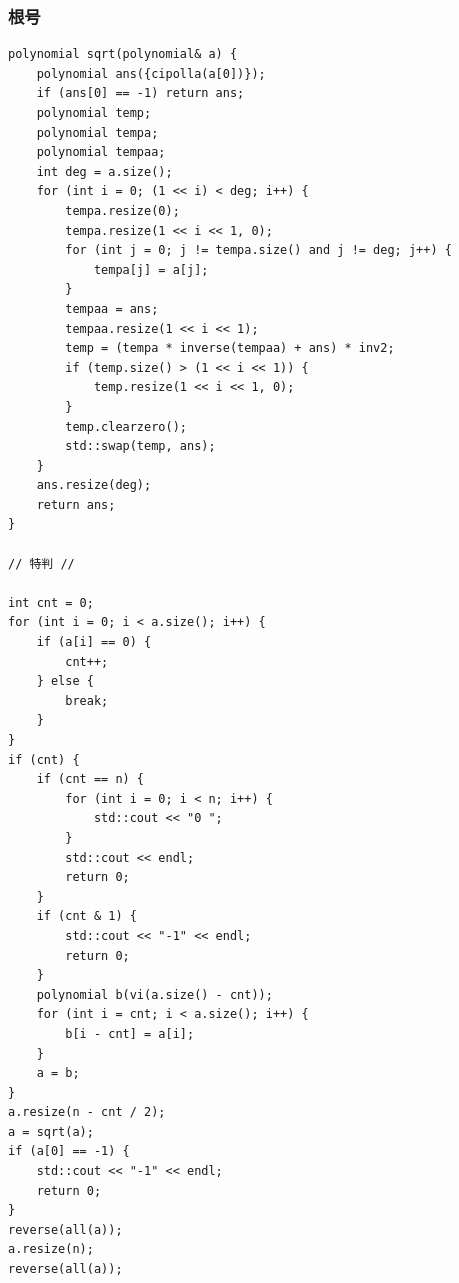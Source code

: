 \documentclass[UTF8, a4paper, titlepage, twoside]{ctexart}
\begin{document}
\subsubsection*{ 根号 }
\begin{lstlisting}[style=cpp]
polynomial sqrt(polynomial& a) {
    polynomial ans({cipolla(a[0])});
    if (ans[0] == -1) return ans;
    polynomial temp;
    polynomial tempa;
    polynomial tempaa;
    int deg = a.size();
    for (int i = 0; (1 << i) < deg; i++) {
        tempa.resize(0);
        tempa.resize(1 << i << 1, 0);
        for (int j = 0; j != tempa.size() and j != deg; j++) {
            tempa[j] = a[j];
        }
        tempaa = ans;
        tempaa.resize(1 << i << 1);
        temp = (tempa * inverse(tempaa) + ans) * inv2;
        if (temp.size() > (1 << i << 1)) {
            temp.resize(1 << i << 1, 0);
        }
        temp.clearzero();
        std::swap(temp, ans);
    }
    ans.resize(deg);
    return ans;
}

// 特判 //

int cnt = 0;
for (int i = 0; i < a.size(); i++) {
    if (a[i] == 0) {
        cnt++;
    } else {
        break;
    }
}
if (cnt) {
    if (cnt == n) {
        for (int i = 0; i < n; i++) {
            std::cout << "0 ";
        }
        std::cout << endl;
        return 0;
    }
    if (cnt & 1) {
        std::cout << "-1" << endl;
        return 0;
    }
    polynomial b(vi(a.size() - cnt));
    for (int i = cnt; i < a.size(); i++) {
        b[i - cnt] = a[i];
    }
    a = b;
}
a.resize(n - cnt / 2);
a = sqrt(a);
if (a[0] == -1) {
    std::cout << "-1" << endl;
    return 0;
}
reverse(all(a));
a.resize(n);
reverse(all(a));
\end{lstlisting}
\end{document}
